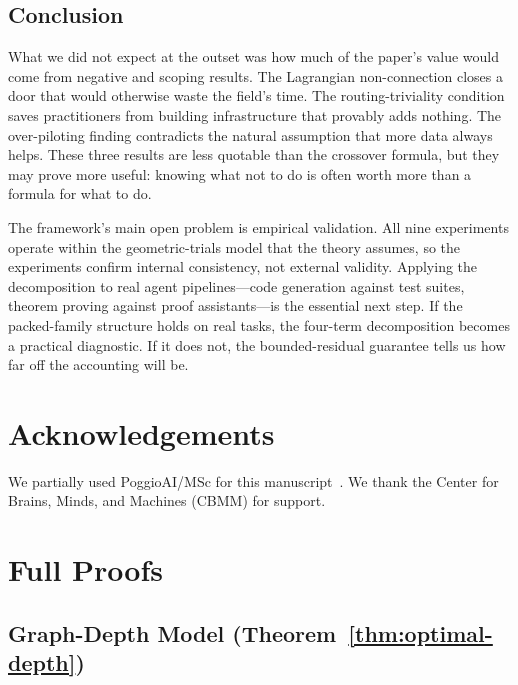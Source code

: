 \documentclass[twoside,11pt]{article}
\begin{document}
\subsection{Conclusion}

What we did not expect at the outset was how much of the paper's value would come from negative and scoping results.
The Lagrangian non-connection closes a door that would otherwise waste the field's time.
The routing-triviality condition saves practitioners from building infrastructure that provably adds nothing.
The over-piloting finding contradicts the natural assumption that more data always helps.
These three results are less quotable than the crossover formula, but they may prove more useful: knowing what not to do is often worth more than a formula for what to do.

The framework's main open problem is empirical validation.
All nine experiments operate within the geometric-trials model that the theory assumes, so the experiments confirm internal consistency, not external validity.
Applying the decomposition to real agent pipelines---code generation against test suites, theorem proving against proof assistants---is the essential next step.
If the packed-family structure holds on real tasks, the four-term decomposition becomes a practical diagnostic.
If it does not, the bounded-residual guarantee tells us how far off the accounting will be.

\section*{Acknowledgements}

We partially used PoggioAI/MSc for this manuscript~\citep{PoggioAIMSc_2026}.
We thank the Center for Brains, Minds, and Machines (CBMM) for support.

\appendix
\section{Full Proofs}
\label{app:proofs}

\subsection{Graph-Depth Model (Theorem~\ref{thm:optimal-depth})}
\label{app:graph-depth}
\end{document}
